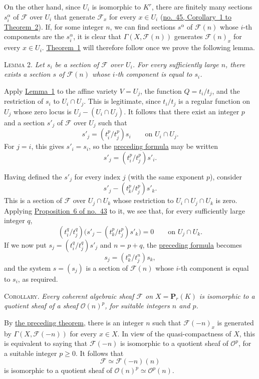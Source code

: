 On the other hand, since $U_i$ is isomorphic to $K^r$, there are finitely
many sections $s_i^\alpha$ of $\mathcal{F}$ over $U_i$ that generate
$\mathcal{F}_x$ for every $x\in U_i$ (\hyperref[fac:II:3:no:45:thm:2:cor:1]{no.~45, Corollary~1 to Theorem~2}).
If, for some integer $n$, we can find sections $s^\alpha$ of
$\mathcal{F}(n)$ whose $i$-th components are the $s_i^\alpha$, it is clear
that $\Gamma(X,\mathcal{F}(n))$ generates $\mathcal{F}(n)_x$ for every
$x\in U_i$. \hyperref[fac:III:2:no:55:theorem:1]{Theorem~1} will therefore
follow once we prove the following
lemma.

\label{fac:III:2:no:55:lemma:2}
\textsc{Lemma 2.}
\textit{Let $s_i$ be a section of $\mathcal{F}$ over $U_i$. For every
sufficiently large $n$, there exists a section $s$ of $\mathcal{F}(n)$ whose
$i$-th component is equal to $s_i$.}

Apply \hyperref[fac:III:2:no:55:lemma:1]{Lemma~1} to the affine variety
$V=U_j$, the function $Q=t_i/t_j$, and
the restriction of $s_i$ to $U_i\cap U_j$. This is legitimate, since
$t_i/t_j$ is a regular function on $U_j$ whose zero locus is
$U_j-(U_i\cap U_j)$. It follows that there exist an integer $p$ and a section
$s'_j$ of $\mathcal{F}$ over $U_j$ such that
\label{fac:III:2:no:55:formula:lemma2-local-extension}
\[
s'_j=(t_i^p/t_j^p)s_i
\qquad\text{on }U_i\cap U_j.
\]
For $j=i$, this gives $s'_i=s_i$, so the \hyperref[fac:III:2:no:55:formula:lemma2-local-extension]{preceding formula} may be written
\[
s'_j=(t_i^p/t_j^p)s'_i.
\]

Having defined the $s'_j$ for every index $j$ (with the same exponent $p$),
consider
\[
s'_j-(t_k^p/t_j^p)s'_k.
\]
This is a section of $\mathcal{F}$ over $U_j\cap U_k$ whose restriction to
$U_i\cap U_j\cap U_k$ is zero. Applying \hyperref[fac:II:3:no:43:prop:6]{Proposition~6 of no.~43} to it, we
see that, for every sufficiently large integer $q$,
\label{fac:III:2:no:55:formula:lemma2-compatibility}
\[
(t_i^q/t_j^q)\bigl(s'_j-(t_k^p/t_j^p)s'_k\bigr)=0
\qquad\text{on }U_j\cap U_k.
\]
If we now put $s_j=(t_i^q/t_j^q)s'_j$ and $n=p+q$, the \hyperref[fac:III:2:no:55:formula:lemma2-compatibility]{preceding formula}
becomes
\label{fac:III:2:no:55:formula:gluing}
\[
s_j=(t_k^n/t_j^n)s_k,
\]
and the system $s=(s_j)$ is a section of $\mathcal{F}(n)$ whose $i$-th
component is equal to $s_i$, as required.

\label{fac:III:2:no:55:corollary}
\textsc{Corollary.}
\textit{Every coherent algebraic sheaf $\mathcal{F}$ on
$X=\mathbf{P}_r(K)$ is isomorphic to a quotient sheaf of a sheaf
$\mathcal{O}(n)^p$, for suitable integers $n$ and $p$.}

By \hyperref[fac:III:2:no:55:theorem:1]{the preceding theorem}, there is an
integer $n$ such that
$\mathcal{F}(-n)_x$ is generated by $\Gamma(X,\mathcal{F}(-n))$ for every
$x\in X$. In view of the quasi-compactness of $X$, this is equivalent to
saying that $\mathcal{F}(-n)$ is isomorphic to a quotient sheaf of
$\mathcal{O}^p$, for a suitable integer $p\geq0$. It follows that
\[
\mathcal{F}\simeq\mathcal{F}(-n)(n)
\]
is isomorphic to a quotient sheaf of
$\mathcal{O}(n)^p\simeq\mathcal{O}^p(n)$.
